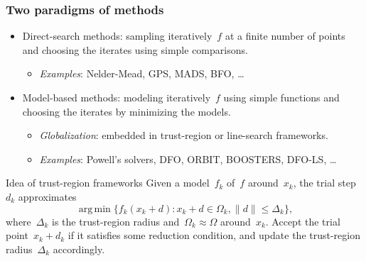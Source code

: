 \documentclass[usenames,dvipsnames,10pt]{beamer}
\newcommand{\norm}[2][]{#1\lVert#2#1\rVert}
\newcommand{\set}[2][]{#1\{#2#1\}}
\DeclareMathOperator*{\argmin}{arg\,min}
\begin{document}
\begin{frame}
    \frametitle{Two paradigms of methods}

    \begin{itemize}
        \setlength{\itemsep}{\bigskipamount}
        \item \alert{Direct-search methods}: sampling iteratively~$f$ at a finite number of points and choosing the iterates using simple comparisons.
        \begin{itemize}
            \item \textit{Examples}: Nelder-Mead, GPS, MADS, BFO, \dots
        \end{itemize}
        \item \alert{Model-based methods}: modeling iteratively~$f$ using simple functions and choosing the iterates by minimizing the models.
        \begin{itemize}
            \item \textit{Globalization}: embedded in \alert{trust-region} or line-search frameworks.
            \item \textit{Examples}: Powell's solvers, DFO, ORBIT, BOOSTERS, DFO-LS, \dots
        \end{itemize}
    \end{itemize}

    \begin{exampleblock}{Idea of trust-region frameworks}
        Given a model~$f_k$ of~$f$ around~$x_k$, the trial step~$d_k$ approximates
        $$\argmin \set[\big]{f_k(x_k + d) : x_k + d \in \Omega_k, \norm{d} \le \Delta_k },$$
        where~$\Delta_k$ is the trust-region radius and~$\Omega_k \approx \Omega$ around~$x_k$.
        Accept the trial point~$x_k + d_k$ if it satisfies some \alert{reduction condition}, and update the trust-region radius~$\Delta_k$ accordingly.
    \end{exampleblock}
\end{frame}
\end{document}
